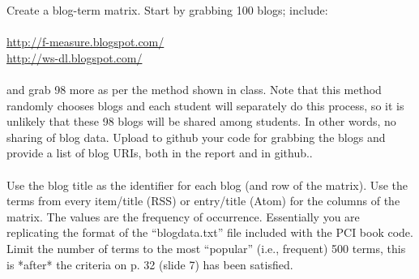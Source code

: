 Create a blog-term matrix.  Start by grabbing 100 blogs; include:\\
\\
\url{http://f-measure.blogspot.com/}\\
\url{http://ws-dl.blogspot.com/}\\
\\
and grab 98 more as per the method shown in class.  Note that this method randomly chooses blogs and each student will separately do this process, so it is unlikely that these 98 blogs will be shared among students.  In other words, no sharing of blog data.  Upload to github your code for grabbing the blogs and provide a list of blog URIs, both in the report and in github..\\
\\
Use the blog title as the identifier for each blog (and row of the matrix).  Use the terms from every item/title (RSS) or entry/title (Atom) for the columns of the matrix.  The values are the frequency of occurrence.  Essentially you are replicating the format of the \enquote{blogdata.txt} file included with the PCI book code.  Limit the number of terms to the most \enquote{popular} (i.e., frequent) 500 terms, this is *after* the criteria on p. 32 (slide 7) has been satisfied.